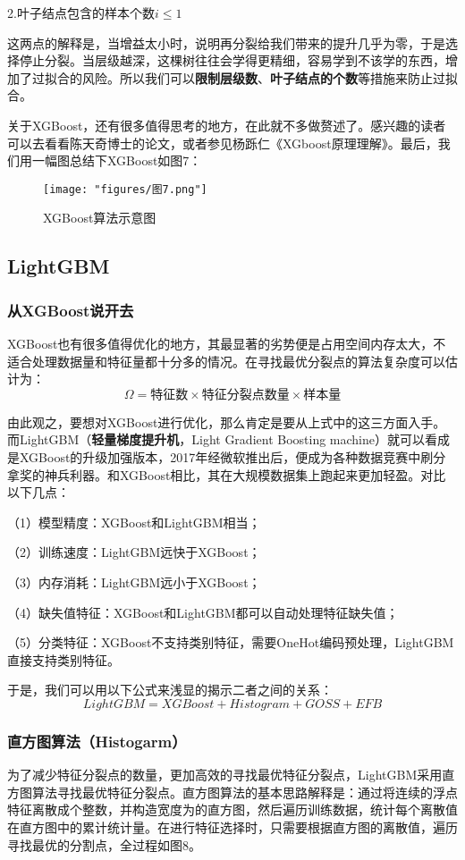 2.叶子结点包含的样本个数$i\leq1$

这两点的解释是，当增益太小时，说明再分裂给我们带来的提升几乎为零，于是选择停止分裂。当层级越深，这棵树往往会学得更精细，容易学到不该学的东西，增加了过拟合的风险。所以我们可以\textbf{限制层级数}、\textbf{叶子结点的个数}等措施来防止过拟合。

关于XGBoost，还有很多值得思考的地方，在此就不多做赘述了。感兴趣的读者可以去看看陈天奇博士的论文，或者参见杨跞仁《XGboost原理理解》。最后，我们用一幅图总结下XGBoost如图7：
\begin{figure}[ht] %
	\centering
	\texttt{[image: "figures/图7.png"]} %
	\caption{XGBoost算法示意图} %
	\label{fig:example} %
\end{figure}
\subsection{LightGBM}
\subsubsection{从XGBoost说开去}
XGBoost也有很多值得优化的地方，其最显著的劣势便是占用空间内存太大，不适合处理数据量和特征量都十分多的情况。在寻找最优分裂点的算法复杂度可以估计为：
$$\Omega=\text{特征数}\times\text{特征分裂点数量}\times\text{样本量}$$

由此观之，要想对XGBoost进行优化，那么肯定是要从上式中的这三方面入手。而LightGBM（\textbf{轻量梯度提升机}，Light Gradient Boosting machine）就可以看成是XGBoost的升级加强版本，2017年经微软推出后，便成为各种数据竞赛中刷分拿奖的神兵利器。和XGBoost相比，其在大规模数据集上跑起来更加轻盈。对比以下几点：

（1）模型精度：XGBoost和LightGBM相当；

（2）训练速度：LightGBM远快于XGBoost；

（3）内存消耗：LightGBM远小于XGBoost；

（4）缺失值特征：XGBoost和LightGBM都可以自动处理特征缺失值；

（5）分类特征：XGBoost不支持类别特征，需要OneHot编码预处理，LightGBM直接支持类别特征。

于是，我们可以用以下公式来浅显的揭示二者之间的关系：
\begin{equation}LightGBM=XGBoost+Histogram+GOSS+EFB\end{equation}
\subsubsection{直方图算法（Histogarm）}
为了减少特征分裂点的数量，更加高效的寻找最优特征分裂点，LightGBM采用直方图算法寻找最优特征分裂点。直方图算法的基本思路解释是：通过将连续的浮点特征离散成个整数，并构造宽度为的直方图，然后遍历训练数据，统计每个离散值在直方图中的累计统计量。在进行特征选择时，只需要根据直方图的离散值，遍历寻找最优的分割点，全过程如图8。

